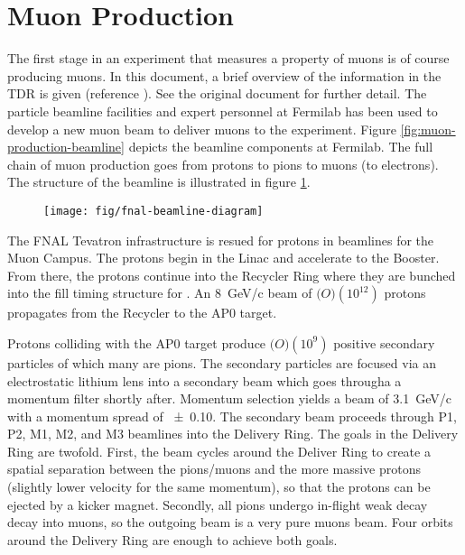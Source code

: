 \section{Muon Production} \label{sec:muon-production}

The first stage in an experiment that measures a property of muons is of course producing muons.  In this document, a brief overview of the information in the TDR is given (reference \cite{e989-tdr}). See the original document for further detail. The particle beamline facilities and expert personnel at Fermilab has been used to develop a new muon beam to deliver muons to the \gmtwo experiment.  Figure \ref{fig:muon-production-beamline} depicts the beamline components at Fermilab.  The full chain of muon production goes from protons to pions to muons (to electrons).  The structure of the beamline is illustrated in figure \ref{fig:fnal-beamline-diagram}.


\begin{figure}
\texttt{[image: fig/fnal-beamline-diagram]}
\caption{ \label{fig:fnal-beamline-diagram}}
\end{figure}

The FNAL Tevatron infrastructure is resued for protons in beamlines for the Muon Campus.  The protons begin in the Linac and accelerate to the Booster.  From there, the protons continue into the Recycler Ring where they are bunched into the fill timing structure for \gmtwo.  An \SI{8}{\GeV/c} beam of $\mathcal(O)(10^12)$ protons propagates from the Recycler to the AP0 target.

Protons colliding with the AP0 target produce $\mathcal(O)(10^9)$ positive secondary particles of which many are pions.  The secondary particles are focused via an electrostatic lithium lens into a secondary beam which goes througha a momentum filter shortly after.  Momentum selection yields a beam of \SI{3.1}{\GeV/c} with a momentum spread of \SI{\pm 0.10}{}.  The secondary beam proceeds through P1, P2, M1, M2, and M3 beamlines into the Delivery Ring.  The goals in the Delivery Ring are twofold.  First, the beam cycles around the Deliver Ring to create a spatial separation between the pions/muons and the more massive protons (slightly lower velocity for the same momentum), so that the protons can be ejected by a kicker magnet.  Secondly, all pions undergo in-flight weak decay decay into muons, so the outgoing beam is a very pure muons beam.  Four orbits around the Delivery Ring are enough to achieve both goals.

